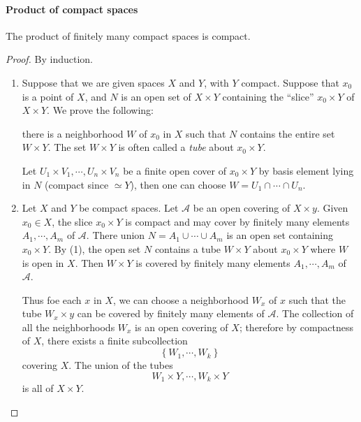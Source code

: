 \paragraph{Product of compact spaces}
\begin{theorem}
  The product of finitely many compact spaces is compact.
\end{theorem}
\begin{proof}
  By induction.
  \begin{enumerate}
    \item Suppose that we are given spaces \( X \) and \( Y \), with \( Y \) compact.
      Suppose that \( x_0 \) is a point of \( X \), and \( N \) is an open set of \( X \times Y \) containing the ``slice'' \( x_0 \times Y \) of \( X \times Y \).
      We prove the following:
      \begin{claim}
        there is a neighborhood \( W \) of \( x_0 \) in \( X \) such that \( N \) contains the entire set \( W \times Y \).
      The set \( W \times Y \) is often called a \emph{tube} about \( x_0 \times Y \).
      \end{claim}
      \begin{claimproof}
        Let \( U_1 \times V_1, \cdots, U_n \times V_n \) be a finite open cover of \( x_0 \times Y \) by basis element lying in \( N \) (compact since \( \simeq Y \)), then one can choose \( W = U_1 \cap \cdots \cap U_n \).
      \end{claimproof}
    \item Let \( X \) and \( Y \) be compact spaces.
      Let \( \mathcal{A} \) be an open covering of \( X \times y \).
      Given \( x_0 \in X \), the slice \( x_0 \times Y \) is compact and may cover by finitely many elements \( A_1, \cdots, A_m \) of \( \mathcal{A} \).
      There union \( N = A_1 \cup \cdots \cup A_m \) is an open set containing \( x_0 \times Y \).
      By (1), the open set \( N \) contains a tube \( W \times Y \) about \( x_0 \times Y \) where \( W \) is open in \( X \).
      Then \( W \times Y \) is covered by finitely many elements \( A_1, \cdots, A_m \) of \( \mathcal{A} \).

      Thus foe each \( x \) in \( X \), we can choose a neighborhood \( W_x \) of \( x \) such that the tube \( W_x \times y \) can be covered by finitely many elements of \( \mathcal{A} \).
      The collection of all the neighborhoods \( W_x \) is an open covering of \( X \);
      therefore by compactness of \( X \), there exists a finite subcollection
      \[
        \left\lbrace W_1, \cdots, W_k \right\rbrace
      \]
      covering \( X \).
      The union of the tubes
      \[
        W_1 \times Y, \cdots, W_k \times Y
      \]
      is all of \( X \times Y \).
  \end{enumerate}
\end{proof}

